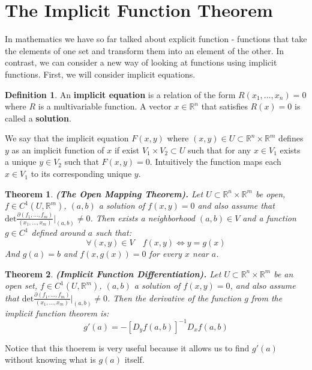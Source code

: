 \documentclass[11pt,a4paper]{article}
\theoremstyle{definition}
\newtheorem{definition}{Definition}[section]
\theoremstyle{plain}
\newtheorem{theorem}{Theorem}[section]
\newcommand{\R}{\mathbb{R}}
\renewcommand{\tt}[1]{\textnormal{\textbf{(#1).}}} %
\begin{document}
	\newpage
	
	
	\section{The Implicit Function Theorem}
	In mathematics we have so far talked about explicit function - functions
	that take the elements of one set and transform them into an element
	of the other. In contrast, we can consider a new way of looking at
	functions using implicit functions. First, we will consider 
	implicit equations.
	\begin{definition}
		An \textbf{implicit equation} is a relation of the form 
		$R(x_1,\dots,x_n) = 0$ where $R$ is a multivariable function.
		A vector $x \in \R^n$ that satisfies $R(x) = 0$ is called a
		\textbf{solution}.
	\end{definition}
	We say that the implicit equation $F(x,y)$ where 
	$(x,y) \in U \subset \R^n \times \R^m$ defines $y$ as an implicit 
	function of $x$ if exist $V_1 \times V_2 \subset U$ such that 
	for any $x \in V_1$ exists a unique $y \in V_2$ such that $F(x,y) = 0$.
	Intuitively the function maps each $x \in V_1$ to its corresponding
	unique $y$.
	\begin{theorem}
		\tt{The Open Mapping Theorem}
		Let $U \subset \R^n \times \R^m$ be open, $f \in C^1(U,\R^m)$, $(a,b)$ 
		a solution of $f(x,y) = 0$ and also assume that $\mathrm{det}
		\frac{\partial(f_1,\dots,f_m)}{(x_1,\dots,x_m)}\vert_{(a,b)} \neq 0$.
		Then exists a neighborhood $(a,b) \in V$ and a function $g \in C^1$ 
		defined around $a$ such that:
		\[
			\forall (x,y) \in V \quad f(x,y) \iff y = g(x)
		\]
		And $g(a) = b$ and $f(x,g(x)) = 0$ for every $x$ near $a$.
	\end{theorem}
	\begin{theorem}
		\tt{Implicit Function Differentiation}
		Let $U \subset \R^n \times \R^m$ be an open set, $f \in C^1(U,\R^m)$, 
		$(a,b)$ a solution of $f(x,y) = 0$, and also assume that $\mathrm{det}
		\frac{\partial(f_1,\dots,f_m)}{(x_1,\dots,x_m)}\vert_{(a,b)} \neq 0$.
		Then the derivative of the function $g$ from the implicit function
		theorem is:
		\[
			g'(a) = -[D_y f(a,b)]^{-1} D_x f(a,b)
		\]
	\end{theorem}
	Notice that this thoerem is very useful because it allows us to find
	$g'(a)$ without knowing what is $g(a)$ itself.
	
	\newpage
	
\end{document}
